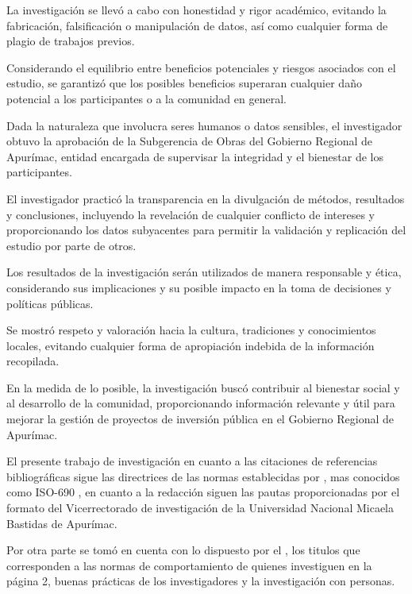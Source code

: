 La investigación se llevó a cabo con honestidad y rigor académico, evitando la fabricación, falsificación o manipulación de datos, así como cualquier forma de plagio de trabajos previos.

Considerando el equilibrio entre beneficios potenciales y riesgos asociados con el estudio, se garantizó que los posibles beneficios superaran cualquier daño potencial a los participantes o a la comunidad en general.

Dada la naturaleza que involucra seres humanos o datos sensibles, el investigador obtuvo la aprobación de la Subgerencia de Obras del Gobierno Regional de Apurímac, entidad encargada de supervisar la integridad y el bienestar de los participantes.

El investigador practicó la transparencia en la divulgación de métodos, resultados y conclusiones, incluyendo la revelación de cualquier conflicto de intereses y proporcionando los datos subyacentes para permitir la validación y replicación del estudio por parte de otros.

Los resultados de la investigación serán utilizados de manera responsable y ética, considerando sus implicaciones y su posible impacto en la toma de decisiones y políticas públicas.

Se mostró respeto y valoración hacia la cultura, tradiciones y conocimientos locales, evitando cualquier forma de apropiación indebida de la información recopilada.

En la medida de lo posible, la investigación buscó contribuir al bienestar social y al desarrollo de la comunidad, proporcionando información relevante y útil para mejorar la gestión de proyectos de inversión pública en el Gobierno Regional de Apurímac.

El presente trabajo de investigación en cuanto a las citaciones de referencias bibliográficas sigue las directrices de las normas establecidas por \cite[]{IOS2021}, mas conocidos como ISO-690 , en cuanto a la redacción siguen las pautas proporcionadas por el formato del Vicerrectorado de investigación de la Universidad Nacional Micaela Bastidas de Apurímac.

Por otra parte se tomó en cuenta con lo dispuesto por el \cite[]{VRI2018}, los titulos que corresponden a las normas de comportamiento de quienes investiguen en la página 2, buenas prácticas de los investigadores y la investigación con personas.
